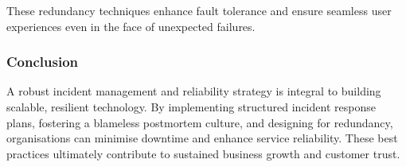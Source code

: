 These redundancy techniques enhance fault tolerance and ensure seamless user experiences even in the face of unexpected failures.

\subsubsection{Conclusion}

A robust incident management and reliability strategy is integral to building scalable, resilient technology. By implementing structured incident response plans, fostering a blameless postmortem culture, and designing for redundancy, organisations can minimise downtime and enhance service reliability. These best practices ultimately contribute to sustained business growth and customer trust.

